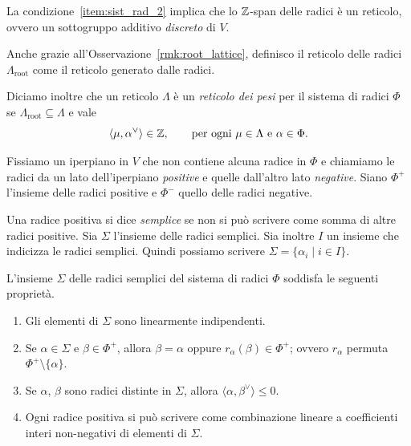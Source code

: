 \begin{remark}
    \label{rmk:root_lattice}
    La condizione~\ref{item:sist_rad_2} implica che lo $\mathbb{Z}$-span delle radici \`e un reticolo,
    ovvero un sottogruppo additivo \emph{discreto} di $V$.
\end{remark}

Anche grazie all'Osservazione~\ref{rmk:root_lattice}, definisco 
il reticolo delle radici $\Lambda_\mathrm{root}$
come il reticolo generato dalle radici.

Diciamo inoltre che un reticolo $\Lambda$ \`e un \emph{reticolo dei pesi} per il sistema
di radici $\Phi$ se $\Lambda_\mathrm{root} \subseteq \Lambda$ e vale
\[
    \langle \mu , \alpha^\vee \rangle \in \mathbb{Z} ,
    \qquad \text{per ogni $\mu \in \Lambda$ e $\alpha \in \Phi$.}
\]

Fissiamo un iperpiano in $V$ che non contiene alcuna radice in $\Phi$ e chiamiamo le radici
da un lato dell'iperpiano \emph{positive} e quelle dall'altro lato \emph{negative}.
Siano $\Phi^+$ l'insieme delle radici positive e $\Phi^-$ quello delle radici negative.

Una radice positiva si dice \emph{semplice} se non si pu\`o scrivere come somma
di altre radici positive.
Sia $\Sigma$ l'insieme delle radici semplici.
Sia inoltre $I$ un insieme che indicizza le radici semplici.
Quindi possiamo scrivere
$\Sigma = \{ \alpha_i \mid i \in I \}$.


\begin{proposition}
    \label{prop:propriet_radici_semplici}
    L'insieme $\Sigma$ delle radici semplici del sistema di radici $\Phi$ 
    soddisfa le seguenti propriet\`a.
    \begin{enumerate}
        \item Gli elementi di $\Sigma$ sono linearmente indipendenti.
        \item Se $\alpha \in \Sigma$ e $\beta \in \Phi^+$, allora $\beta = \alpha$
            oppure $r_\alpha (\beta) \in \Phi^+$; ovvero $r_\alpha$ permuta
            $\Phi^+ \setminus \{ \alpha \} $.
        \item Se $\alpha$, $\beta$ sono radici distinte in $\Sigma$, allora
            $\langle \alpha, \beta^\vee \rangle \leq 0 $.
        \item Ogni radice positiva si pu\`o scrivere come combinazione lineare a coefficienti
            interi non-negativi di elementi di $\Sigma$.
    \end{enumerate}
\end{proposition}

